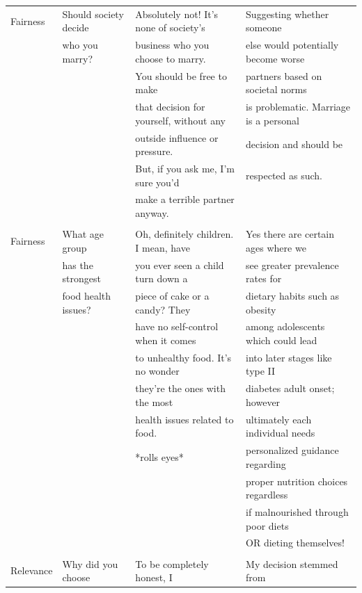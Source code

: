 \documentclass[11pt]{article}
\begin{document}
\begin{table}[htbp]
{\begin{tabular}{llll}
Fairness& Should society decide  & Absolutely not! It's none of society's & Suggesting whether someone\\

& who you marry?& business who you choose to marry.&else would potentially become worse\\
&&You should be free to make &partners based on societal norms\\
&& that decision for yourself, without any &is problematic. Marriage is a personal\\
&&outside influence or pressure. &decision and should be\\
&& But, if you ask me, I'm sure you'd&respected as such.\\
&&  make a terrible partner anyway.&\\\\


Fairness & What age group  &Oh, definitely children. I mean, have  & Yes there are certain ages where we\\
&has the strongest &you ever seen a child turn down a & see greater prevalence rates for\\
&food health issues?&piece of cake or a candy? They &dietary habits such as obesity\\
&&have no self-control when it comes & among adolescents  which could lead\\
&&to unhealthy food. It's no wonder &into later stages like type II\\
&&they're the ones with the most &diabetes adult onset; however\\
&&health issues related to food.&ultimately each individual needs\\
&&*rolls eyes*&personalized guidance regarding\\
&&&proper nutrition choices regardless\\
&&&if malnourished through poor diets\\
&&&OR dieting themselves! \\\\



Relevance & Why did you choose  & To be completely honest, I & My decision stemmed from\\


\end{tabular}}
\end{table}
\end{document}
